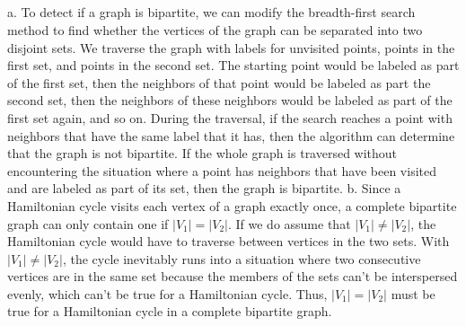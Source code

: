 \documentclass{article}
\begin{document}
\subsection{}
a. To detect if a graph is bipartite, we can modify the breadth-first search method to find whether the vertices of the graph can be separated into two disjoint sets. We traverse the graph with labels for unvisited points, points in the first set, and points in the second set. The starting point would be labeled as part of the first set, then the neighbors of that point would be labeled as part the second set, then the neighbors of these neighbors would be labeled as part of the first set again, and so on. During the traversal, if the search reaches a point with neighbors that have the same label that it has, then the algorithm can determine that the graph is not bipartite. If the whole graph is traversed without encountering the situation where a point has neighbors that have been visited and are labeled as part of its set, then the graph is bipartite.
\newline
b. Since a Hamiltonian cycle visits each vertex of a graph exactly once, a complete bipartite graph can only contain one if $|V_1| = |V_2|$. If we do assume that $|V_1| \neq |V_2|$, the Hamiltonian cycle would have to traverse between vertices in the two sets. With $|V_1| \neq |V_2|$, the cycle inevitably runs into a situation where two consecutive vertices are in the same set because the members of the sets can't be interspersed evenly, which can't be true for a Hamiltonian cycle. Thus, $|V_1| = |V_2|$ must be true for a Hamiltonian cycle in a complete bipartite graph.
\end{document}

